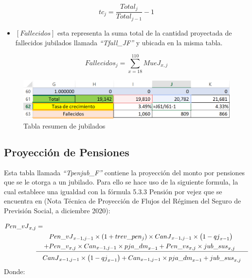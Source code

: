 \documentclass[
  letterpaper,
  DIV=11,
  numbers=noendperiod]{scrreprt}
\providecommand{\tightlist}{%
  \setlength{\itemsep}{0pt}\setlength{\parskip}{0pt}}\usepackage{longtable,booktabs,array}
\begin{document}
\begin{equation}
{tc}_j=\frac{{Total}_j}{{Total}_{j-1}}-1
\end{equation}

\begin{itemize}
\tightlist
\item
  \([Fallecidos]\) esta representa la suma total de la cantidad
  proyectada de fallecidos jubilados llamada \emph{``Tfall\_JF''} y
  ubicada en la misma tabla.
\end{itemize}

\begin{equation}
{Fallecidos}_j=\sum_{x=18}^{110}{MueJ}_{x,j}
\end{equation}

\begin{figure}

{\centering \includegraphics{images/F/Img27.png}

}

\caption{Tabla resumen de jubilados}

\end{figure}

\hypertarget{proyecciuxf3n-de-pensiones}{%
\subsection{Proyección de Pensiones}\label{proyecciuxf3n-de-pensiones}}

Esta tabla llamada \emph{``Tpenjub\_F''} contiene la proyección del
monto por pensiones que se le otorga a un jubilado. Para ello se hace
uso de la siguiente formula, la cual establece una igualdad con la
fórmula 5.3.3 Pensión por vejez que se encuentra en (Nota Técnica de
Proyección de Flujos del Régimen del Seguro de Previsión Social, a
diciembre 2020):

\begin{align}
{Pen\_vJ}_{x,j} & = \nonumber \\ 
& \hspace{2 em}{Pen\_vJ}_{x-1,j-1} \times \left ( 1+trev\_pen_j \right ) \times {CanJ}_{x-1,j-1} \times \left ( 1-{qj}_{x-1} \right ) \nonumber \\
& \underline{ \hspace{1.2 em} +  { Pen\_v}_{x,j}\times{Can}_{x-1,j-1}\times{pja\_{dm}}_{x-1}+{Pen\_vs}_{x,j}\times{jub\_sus}_{x,j} \hspace{2 em}} \nonumber \\
&\hspace{1 em}{CanJ}_{x-1,j-1}\times\left(1-{qj}_{x-1}\right)+{Can}_{x-1,j-1}\times{pja\_{dm}}_{x-1}+{jub\_sus}_{x,j} 
\end{align} Donde:
\end{document}

